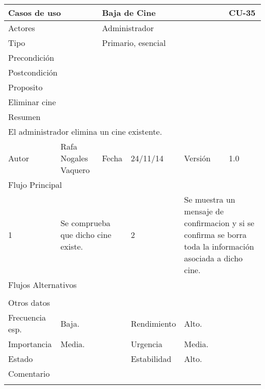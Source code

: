 \documentclass{article}
\begin{document}
\clearpage


\begin{table}[h]
\begin{tabular}{|l|l|l|l|l|l|}
\hline
\multicolumn{2}{|p{2cm}|}{Casos de uso}  & \multicolumn{3}{p{7cm}|}{Baja de Cine} & CU-35 \\
\hline
\multicolumn{2}{|p{2cm}|}{Actores}       & \multicolumn{4}{p{8cm}|}{Administrador}        \\
\hline
\multicolumn{2}{|p{2cm}|}{Tipo}          & \multicolumn{4}{p{8cm}|}{Primario, esencial}        \\
\hline
\multicolumn{2}{|p{2cm}|}{Precondición}  & \multicolumn{4}{p{8cm}|}{}        \\
\hline
\multicolumn{2}{|p{2cm}|}{Postcondición} & \multicolumn{4}{p{8cm}|}{}        \\
\hline
\multicolumn{6}{|p{10cm}|}{Proposito}                                   \\
\hline
\multicolumn{6}{|p{10cm}|}{Eliminar cine}                                            \\
\hline
\multicolumn{6}{|p{10cm}|}{Resumen}                                 \\
\hline
\multicolumn{6}{|p{10cm}|}{El administrador elimina un cine existente.}                                            \\
\hline
Autor         &       Rafa Nogales Vaquero        &  Fecha   &  24/11/14   &   Versión  & 1.0\\
\hline
\multicolumn{6}{|p{10cm}|}{Flujo Principal}\\
\hline
\multicolumn{1}{|p{1cm}|}{1} & \multicolumn{2}{p{3cm}}{Se comprueba que dicho cine existe.} & \multicolumn{1}{|p{1cm}|}{2} & \multicolumn{2}{p{3cm}|}{Se muestra un mensaje de confirmacion y si se confirma se borra toda la información asociada a dicho cine.}\\
\hline
\multicolumn{6}{|p{10cm}|}{Flujos Alternativos}\\
\hline
\multicolumn{1}{|p{1cm}}{} & \multicolumn{5}{|p{9cm}|}{}\\
\hline
\multicolumn{6}{|p{10cm}|}{Otros datos}\\
\hline
\multicolumn{1}{|p{2cm}|}{Frecuencia esp.} & \multicolumn{2}{p{3cm}}{Baja.} & \multicolumn{1}{|p{2cm}|}{Rendimiento} & \multicolumn{2}{p{3cm}|}{Alto.}\\
\hline
\multicolumn{1}{|p{2cm}|}{Importancia} & \multicolumn{2}{p{3cm}}{Media.} & \multicolumn{1}{|p{2cm}|}{Urgencia} & \multicolumn{2}{p{3cm}|}{Media.}\\
\hline
\multicolumn{1}{|p{2cm}|}{Estado} & \multicolumn{2}{p{3cm}}{} & \multicolumn{1}{|p{2cm}|}{Estabilidad} & \multicolumn{2}{p{3cm}|}{Alto.}\\
\hline
\multicolumn{6}{|p{10cm}|}{Comentario}\\
\hline
\multicolumn{6}{|p{10cm}|}{}\\
\hline
\end{tabular}
\end{table}
\end{document}

